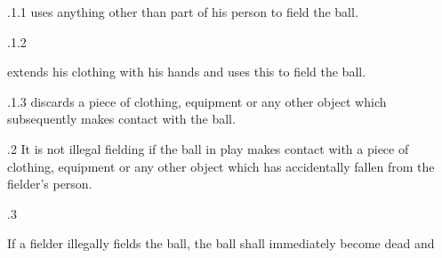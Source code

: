 \documentclass[12pt]{article}
\begin{document}
\vspace{\baselineskip}
\begin{adjustwidth}{0.49in}{0.0in}
{\fontsize{9pt}{10.8pt}.1.1 \tabto{1.17in} uses anything other than part of his person to field the ball.\par}\par

\end{adjustwidth}


\vspace{\baselineskip}
\begin{adjustwidth}{0.49in}{0.0in}
{\fontsize{9pt}{10.8pt}.1.2 \tabto{1.17in} {\fontsize{8pt}{9.6pt}\selectfont extends his clothing with his hands and uses this to field the ball.\par}\par}\par

\end{adjustwidth}


\vspace{\baselineskip}
\begin{adjustwidth}{1.18in}{0.12in}
{\fontsize{9pt}{10.8pt}.1.3 \tabto{1.17in} discards a piece of clothing, equipment or any other object which subsequently makes contact with the ball.\par}\par

\end{adjustwidth}


\vspace{\baselineskip}
\begin{adjustwidth}{0.5in}{0.01in}
{\fontsize{9pt}{10.8pt}.2 \tabto{0.49in} It is not illegal fielding if the ball in play makes contact with a piece of clothing, equipment or any other object which has accidentally fallen from the fielder’s person.\par}\par

\end{adjustwidth}


\vspace{\baselineskip}
{\fontsize{9pt}{10.8pt}.3 \tabto{0.49in} {\fontsize{8pt}{9.6pt}\selectfont If a fielder illegally fields the ball, the ball shall immediately become dead and\par}\par}\par
\end{document}
